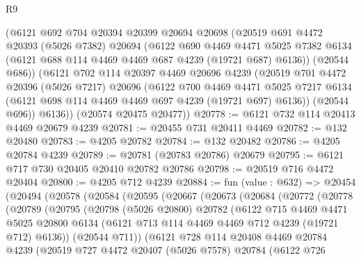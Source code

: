 \begin{lexlean}{R9}
\begin{coremodule}
      (@6121
        @692
        @704
        @20394
        @20399
        @20694
        @20698
        (@20519
          @691
          @4472
          @20393
          (@5026 @7382)
          @20694
          (@6122
            @690
            @4469
            @4471
            @5025
            @7382
            @6134
            (@6121 @688 @114 @4469 @4469 @687 @4239 (@19721 @687) @6136))
          (@20544 @686))
        (@6121
          @702
          @114
          @20397
          @4469
          @20696
          @4239
          (@20519
            @701
            @4472
            @20396
            (@5026 @7217)
            @20696
            (@6122
              @700
              @4469
              @4471
              @5025
              @7217
              @6134
              (@6121 @698 @114 @4469 @4469 @697 @4239 (@19721 @697) @6136))
            (@20544 @696))
          @6136))
      (@20574 @20475 @20477))
@20778 := @6121 @732 @114 @20413 @4469 @20679 @4239
@20781 := @20455 @731 @20411 @4469
@20782 := @132 @20480
@20783 := @4205 @20782
@20784 := @132 @20482
@20786 := @4205 @20784 @4239
@20789 := @20781 (@20783 @20786) @20679
@20795 := @6121 @717 @730 @20405 @20410 @20782 @20786
@20798 := @20519 @716 @4472 @20404
@20800 := @4205 @712 @4239
@20884 := fun (value : @632) =>
  @20454
    (@20494
      (@20578
        (@20584
          (@20595
            (@20667
              (@20673
                (@20684
                  (@20772
                    (@20778
                      (@20789
                        (@20795
                          (@20798
                            (@5026 @20800)
                            @20782
                            (@6122
                              @715
                              @4469
                              @4471
                              @5025
                              @20800
                              @6134
                              (@6121 @713 @114 @4469 @4469 @712 @4239 (@19721 @712) @6136))
                            (@20544 @711))
                          (@6121
                            @728
                            @114
                            @20408
                            @4469
                            @20784
                            @4239
                            (@20519
                              @727
                              @4472
                              @20407
                              (@5026 @7578)
                              @20784
                              (@6122
                                @726

\end{coremodule}
\end{lexlean}
